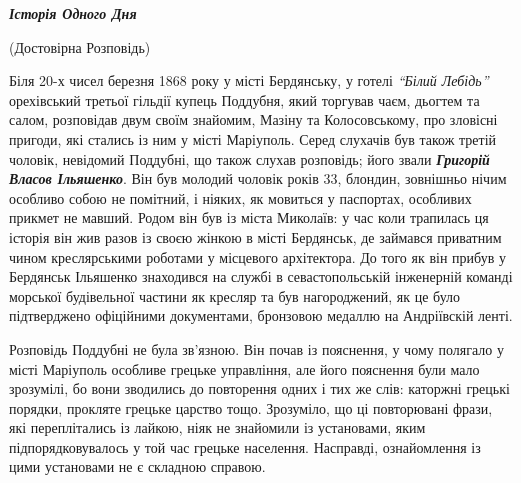 \documentclass[a4paper,20pt]{report}
\begin{document}
\begin{center}
\bfseries\em\Huge
Історія Одного Дня 

(Достовірна Розповідь)
\end{center}

\Large

Біля 20-х чисел березня 1868 року у місті Бердянську, у готелі \emph{``Білий Лебідь''}
орехівський третьої гільдії купець Поддубня, який торгував чаєм, дьогтем та
салом, розповідав двум своїм знайомим, Мазіну та Колосовському, про зловісні
пригоди, які стались із ним у місті Маріуполь. Серед слухачів був також третій
чоловік, невідомий Поддубні, що також слухав розповідь; його звали \textbf{\em
Григорій Власов Ільяшенко}. Він був молодий чоловік років 33, блондин,
зовнішньо нічим особливо собою не помітний, і ніяких, як мовиться у паспортах,
особливих прикмет не мавший.  Родом він був із міста Миколаїв: у час коли
трапилась ця історія він жив разов із своєю жінкою в місті Бердянськ, де
займався приватним чином креслярськими роботами у місцевого архітектора. До
того як він прибув у Бердянськ Ільяшенко знаходився на службі в
севастопольській інженерній команді морської будівельної частини як кресляр та
був нагороджений, як це було підтверджено офіційними документами, бронзовою
медаллю на Андріївскій ленті.

Розповідь Поддубні не була зв'язною. Він почав із пояснення, у чому полягало у
місті Маріуполь особливе грецьке управління, але його пояснення були мало
зрозумілі, бо вони зводились до повторення одних і тих же слів: каторжні
грецькі порядки, прокляте грецьке царство тощо. Зрозуміло, що ці повторювані
фрази, які переплітались із лайкою, ніяк не знайомили із установами, яким
підпорядковувалось у той час грецьке населення. Насправді, ознайомлення із цими
установами не є складною справою.
\end{document}
